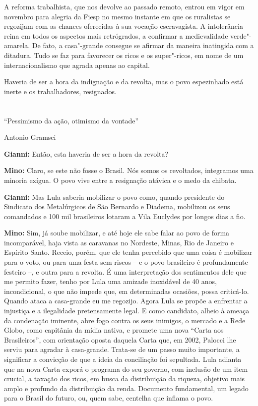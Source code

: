 A reforma trabalhista, que nos devolve ao passado remoto, entrou em
vigor em novembro para alegria da Fiesp no mesmo instante em que os
ruralistas se regozijam com as chances oferecidas à sua vocação
escravagista. A intolerância reina em todos os aspectos mais
retrógrados, a confirmar a medievalidade verde"-amarela. De fato, a
casa"-grande consegue se afirmar da maneira inatingida com a ditadura.
Tudo se faz para favorecer os ricos e os super"-ricos, em nome de um
internacionalismo que agrada apenas ao capital.

Haveria de ser a hora da indignação e da revolta, mas o povo espezinhado
está inerte e os trabalhadores, resignados.



\chapter*{}

\epigraph{``Pessimismo da ação, otimismo da vontade''}{Antonio Gramsci}


\parindent0pt
\parskip4pt

\textbf{Gianni:} Então, esta haveria de ser a hora da revolta?

\textbf{Mino:} Claro, se este não fosse o Brasil. Nós somos os
revoltados, integramos uma minoria exígua. O povo vive entre a
resignação atávica e o medo da chibata.

\textbf{Gianni:} Mas Lula saberia mobilizar o povo como, quando
presidente do Sindicato dos Metalúrgicos de São Bernardo e Diadema,
mobilizou os seus comandados e 100 mil brasileiros lotaram a Vila
Euclydes por longos dias a fio.

\textbf{Mino:} Sim, já soube mobilizar, e até hoje ele sabe falar ao
povo de forma incomparável, haja vista as caravanas no Nordeste, Minas,
Rio de Janeiro e Espírito Santo. Receio, porém, que ele tenha percebido
que uma coisa é mobilizar para o voto, ou para uma festa sem riscos -- e
o povo brasileiro é profundamente festeiro --, e outra para a revolta. É
uma interpretação dos sentimentos dele que me permito fazer, tenho por
Lula uma amizade inoxidável de 40 anos, incondicional, o que não impede
que, em determinadas ocasiões, possa criticá-lo. Quando ataca a
casa-grande eu me regozijo. Agora Lula se propõe a enfrentar a injustiça
e a ilegalidade pretensamente legal. E como candidato, alheio à ameaça
da condenação iminente, abre fogo contra os seus inimigos, o mercado e a
Rede Globo, como capitânia da mídia nativa, e promete uma nova ``Carta
aos Brasileiros'', com orientação oposta daquela Carta que, em 2002,
Palocci lhe serviu para agradar à casa-grande. Trata-se de um passo
muito importante, a significar a convicção de que a ideia da conciliação
foi sepultada. Lula adianta que na nova Carta exporá o programa do seu
governo, com inclusão de um item crucial, a taxação dos ricos, em busca
da distribuição da riqueza, objetivo mais amplo e profundo da
distribuição da renda. Documento fundamental, um legado para o Brasil do
futuro, ou, quem sabe, centelha que inflama o povo.

